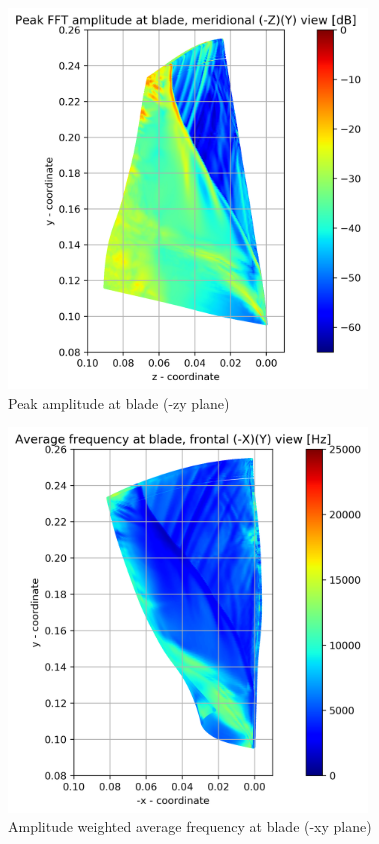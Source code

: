 \begin{figure}[ht]
	\centering
	\includegraphics[width=0.85\textwidth]{Figures/blade-negzy-peak-mag.png}
	\caption{Peak amplitude at blade (-zy plane)} \label{blade-negzy-peak-mag}
\end{figure}
\begin{figure}[ht]
	\centering
	\includegraphics[width=0.85\textwidth]{Figures/blade-negxy-awaf.png}
    \caption{Amplitude weighted average frequency at blade (-xy plane)} \label{blade-negxy-awaf}
\end{figure}	

